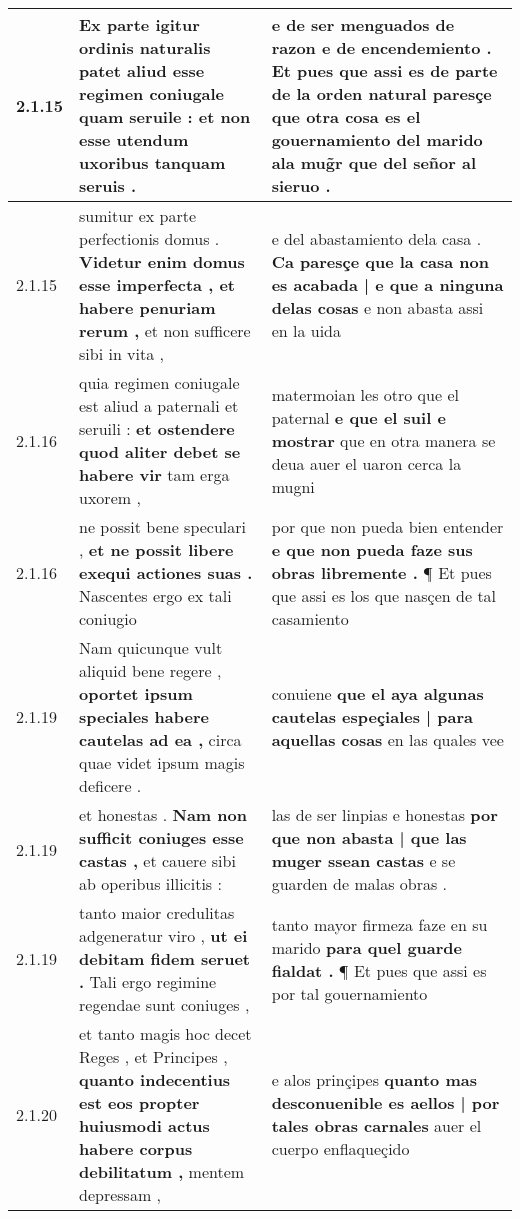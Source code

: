 \begin{tabular}{|p{1cm}|p{6.5cm}|p{6.5cm}|}
2.1.15 & Ex parte igitur ordinis naturalis \textbf{ patet aliud esse regimen coniugale quam seruile : } et non esse utendum uxoribus tanquam seruis . & e de ser menguados de razon e de encendemiento . \textbf{ Et pues que assi es de parte de la orden natural paresçe que otra cosa es el gouernamiento del marido ala mug̃r } que del señor al sieruo . \\\hline
2.1.15 & sumitur ex parte perfectionis domus . \textbf{ Videtur enim domus esse imperfecta , et habere penuriam rerum , } et non sufficere sibi in vita , & e del abastamiento dela casa . \textbf{ Ca paresçe que la casa non es acabada | e que a ninguna delas cosas } e non abasta assi en la uida \\\hline
2.1.16 & quia regimen coniugale est aliud a paternali et seruili : \textbf{ et ostendere quod aliter debet se habere vir } tam erga uxorem , & matermoian les otro que el paternal \textbf{ e que el suil e mostrar } que en otra manera se deua auer el uaron cerca la mugni \\\hline
2.1.16 & ne possit bene speculari , \textbf{ et ne possit libere exequi actiones suas . } Nascentes ergo ex tali coniugio & por que non pueda bien entender \textbf{ e que non pueda faze sus obras libremente . } ¶ Et pues que assi es los que nasçen de tal casamiento \\\hline
2.1.19 & Nam quicunque vult aliquid bene regere , \textbf{ oportet ipsum speciales habere cautelas ad ea , } circa quae videt ipsum magis deficere . & conuiene \textbf{ que el aya algunas cautelas espeçiales | para aquellas cosas } en las quales vee \\\hline
2.1.19 & et honestas . \textbf{ Nam non sufficit coniuges esse castas , } et cauere sibi ab operibus illicitis : & las de ser linpias e honestas \textbf{ por que non abasta | que las muger ssean castas } e se guarden de malas obras . \\\hline
2.1.19 & tanto maior credulitas adgeneratur viro , \textbf{ ut ei debitam fidem seruet . } Tali ergo regimine regendae sunt coniuges , & tanto mayor firmeza faze en su marido \textbf{ para quel guarde fialdat . } ¶ Et pues que assi es por tal gouernamiento \\\hline
2.1.20 & et tanto magis hoc decet Reges , et Principes , \textbf{ quanto indecentius est eos propter huiusmodi actus habere corpus debilitatum , } mentem depressam , & e alos prinçipes \textbf{ quanto mas desconuenible es aellos | por tales obras carnales } auer el cuerpo enflaqueçido \\\hline

\end{tabular}
